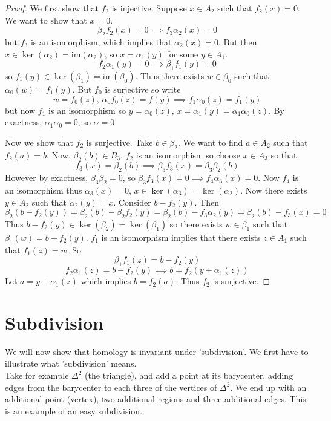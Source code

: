 \documentclass[a4paper,14pt]{extarticle}
\theoremstyle{definition}
\begin{document}
\begin{proof}
	We first show that $f_2$ is injective. Suppose $x\in A_2$ such
	that $f_2(x)=0$. We want to show that $x=0$.
	\[\beta_2 f_2(x)=0\implies f_3\alpha_2(x)=0\]
	but $f_3$ is an isomorphism, which implies that $\alpha_2(x)=0$.
	But then $x\in\ker(\alpha_2)=\text{im}(\alpha_2)$, so $x=\alpha_1(y)$
	for some $y\in A_1$. \[f_2\alpha_1(y)=0\implies \beta_1 f_1(y)=0\]
	so $f_1(y)\in\ker(\beta_1)=\text{im}(\beta_0)$.
	Thus there exists $w\in\beta_0$
	such that $\alpha_0(w)=f_1(y)$. But $f_0$ is surjective so write
	\[w=f_0(z), \,\alpha_0 f_0(z)=f(y)\implies f_1\alpha_0(z)=f_1(y)\]
	but now $f_1$ is an isomorphism so $y=\alpha_0(z), \,x=\alpha_1(y)=
	\alpha_1\alpha_0(z)$. By exactness, $\alpha_1\alpha_0=0$, so $\alpha=0$

	\vspace{12pt}

	Now we show that $f_2$ is surjective. Take $b\in\beta_2$. We want to find
	$a\in A_2$ such that $f_2(a)=b$. Now, $\beta_2(b)\in B_3$. $f_2$ is an 
	isomorphism so choose $x\in A_3$ so that \[f_3(x)=\beta_2(b)
	\implies \beta_3 f_3(x)=\beta_3\beta_2(b)\] However by exactness,
	$\beta_3\beta_2=0$, so $\beta_3f_3(x)=0\implies f_4\alpha_3(x)=0$.
	Now $f_4$ is an isomorphism thus $\alpha_3(x)=0$, $x\in\ker(\alpha_3)
	=\ker(\alpha_2)$. Now there exists $y\in A_2$ such that $\alpha_2(y)=x$.
	Consider $b-f_2(y)$. Then \[\beta_2(b-f_2(y))=\beta_2(b)-\beta_2f_2(y)
	=\beta_2(b)-f_3\alpha_2(y)=\beta_2(b)-f_3(x)=0\] Thus
	$b-f_2(y)\in\ker(\beta_2)=\ker(\beta_1)$ so there exists $w\in\beta_1$
	such that $\beta_1(w)=b-f_2(y)$. $f_1$ is an isomorphism implies that
	there exists $z\in A_1$ such that $f_1(z)=w$. So \[\beta_1f_1(z)=b-f_2(y)\]
	\[f_2\alpha_1(z)=b-f_2(y)\implies b=f_2(y+\alpha_1(z))\]
	Let $a=y+\alpha_1(z)$ which implies $b=f_2(a)$. Thus $f_2$ is surjective.
\end{proof}

\section{Subdivision}
We will now show that homology is invariant under 'subdivision'. We first have to illustrate
what 'subdivision' means. \\

Take for example $\Delta^2$ (the triangle), and add a point at its barycenter,
adding edges from the barycenter to each three of the vertices of $\Delta^2$.
We end up with an additional point (vertex), two additional regions and three additional
edges. This is an example of an easy subdivision.
\end{document}
